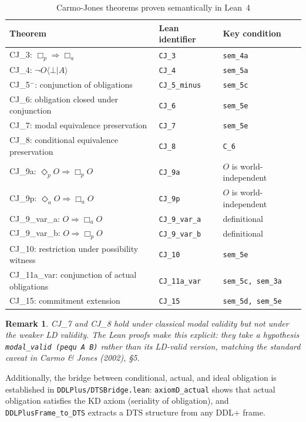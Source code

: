 \documentclass[]{article}
\newtheorem{remark}[theorem]{Remark}
\newcommand{\code}[1]{\texttt{#1}}
\newcommand{\DDL}{\textup{DDL+}}
\newcommand{\DTS}{\textup{DTS}}
\begin{document}
\begin{longtable}{lll}
\caption{Carmo-Jones theorems proven semantically in Lean~4}\label{tab:cj}\\
\textbf{Theorem} & \textbf{Lean identifier} & \textbf{Key condition} \\
\hline
CJ\_3: $\Box_p \Rightarrow \Box_a$ & \code{CJ\_3} & \code{sem\_4a} \\
CJ\_4: $\neg O\langle \bot | A \rangle$ & \code{CJ\_4} & \code{sem\_5a} \\
CJ\_5$^-$: conjunction of obligations & \code{CJ\_5\_minus} & \code{sem\_5c} \\
CJ\_6: obligation closed under conjunction & \code{CJ\_6} & \code{sem\_5e} \\
CJ\_7: modal equivalence preservation & \code{CJ\_7} & \code{sem\_5e} \\
CJ\_8: conditional equivalence preservation & \code{CJ\_8} & \code{C\_6} \\
CJ\_9a: $\Diamond_p O \Rightarrow \Box_p O$ & \code{CJ\_9a} & $O$ is world-independent \\
CJ\_9p: $\Diamond_a O \Rightarrow \Box_a O$ & \code{CJ\_9p} & $O$ is world-independent \\
CJ\_9\_var\_a: $O \Rightarrow \Box_a O$ & \code{CJ\_9\_var\_a} & definitional \\
CJ\_9\_var\_b: $O \Rightarrow \Box_p O$ & \code{CJ\_9\_var\_b} & definitional \\
CJ\_10: restriction under possibility witness & \code{CJ\_10} & \code{sem\_5e} \\
CJ\_11a\_var: conjunction of actual obligations & \code{CJ\_11a\_var} & \code{sem\_5c, sem\_3a} \\
CJ\_15: commitment extension & \code{CJ\_15} & \code{sem\_5d, sem\_5e} \\
\hline
\end{longtable}

\begin{remark}
CJ\_7 and CJ\_8 hold under \emph{classical modal validity} but not under the
weaker LD validity.  The Lean proofs make this explicit: they take a hypothesis
\code{modal\_valid (pequ A B)} rather than its LD-valid version, matching the
standard caveat in Carmo \& Jones (2002), §5.
\end{remark}

Additionally, the bridge between conditional, actual, and ideal obligation is
established in \code{DDLPlus/DTSBridge.lean}:
\code{axiomD\_actual} shows that actual obligation satisfies the KD axiom
(seriality of obligation), and \code{DDLPlusFrame\_to\_DTS} extracts a
\DTS{} structure from any \DDL{} frame.
\end{document}
